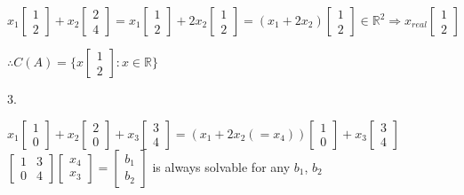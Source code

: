 \documentclass[12pt,a4paper]{article}
\begin{document}
$
x_1
\begin{bmatrix}
  1 \\
  2
\end{bmatrix} + 
x_2
\begin{bmatrix}
  2 \\
  4
\end{bmatrix} = 
x_1
\begin{bmatrix}
  1 \\
  2
\end{bmatrix} + 
2x_2
\begin{bmatrix}
  1 \\
  2
\end{bmatrix} =
(x_1 + 2x_2)
\begin{bmatrix}
  1 \\
  2
\end{bmatrix} \in \mathbb{R}^2 \Rightarrow
x_{real}
\begin{bmatrix}
  1 \\
  2
\end{bmatrix}
$

$\therefore C(A) =
\{
  x
  \begin{bmatrix}
    1 \\
    2
  \end{bmatrix}
  : x \in \mathbb{R}
\}
$

3.

$
x_1
\begin{bmatrix}
  1 \\
  0
\end{bmatrix} +
x_2
\begin{bmatrix}
  2 \\
  0
\end{bmatrix} +
x_3
\begin{bmatrix}
  3 \\
  4
\end{bmatrix} =
(x_1 + 2x_2 (= x_4))
\begin{bmatrix}
  1 \\
  0
\end{bmatrix} +
x_3
\begin{bmatrix}
  3 \\
  4
\end{bmatrix} 
$
$
  \begin{bmatrix}
    1 & 3 \\
    0 & 4
  \end{bmatrix}
  \begin{bmatrix}
    x_4 \\
    x_3
  \end{bmatrix} = 
  \begin{bmatrix}
    b_1 \\
    b_2
  \end{bmatrix}
$ is always solvable for any $b_1$, $b_2$
\end{document}
